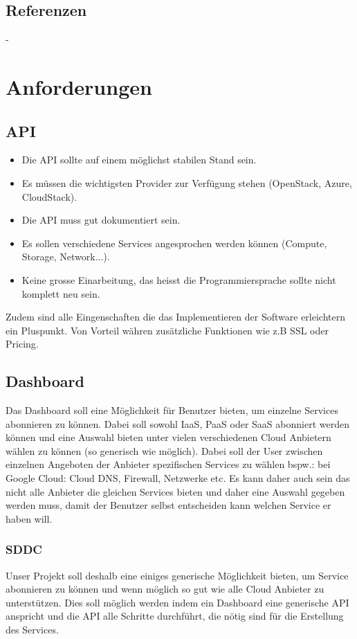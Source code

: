 \documentclass[11pt]{scrartcl}
\begin{document}
\subsection{Referenzen}
-

\section{Anforderungen}
\subsection{API}
\begin{itemize}
\item Die API sollte auf einem möglichst stabilen Stand sein.
\item Es müssen die wichtigsten Provider zur Verfügung stehen (OpenStack, Azure, CloudStack).
\item Die API muss gut dokumentiert sein.
\item Es sollen verschiedene Services angesprochen werden können (Compute, Storage, Network...).
\item Keine grosse Einarbeitung, das heisst die Programmiersprache sollte nicht komplett neu sein.
\end{itemize}

Zudem sind alle Eingenschaften die das Implementieren der Software erleichtern ein Pluspunkt. Von Vorteil währen zusätzliche Funktionen wie z.B SSL oder Pricing. 

\subsection{Dashboard}
Das Dashboard soll eine Möglichkeit für Benutzer bieten, um einzelne Services 
abonnieren zu können.
Dabei soll sowohl IaaS, PaaS oder SaaS abonniert werden können und eine Auswahl 
bieten unter vielen verschiedenen Cloud Anbietern wählen zu können (so generisch wie 
möglich).
Dabei soll der User zwischen einzelnen Angeboten der Anbieter spezifischen 
Services zu wählen bspw.: bei Google Cloud: Cloud DNS, Firewall, Netzwerke etc.
Es kann daher auch sein das nicht alle Anbieter die gleichen Services bieten und 
daher eine Auswahl gegeben werden muss, damit der Benutzer selbst entscheiden 
kann welchen Service er haben will.

\subsubsection{SDDC}
Unser Projekt soll deshalb eine einiges generische Möglichkeit bieten, um 
Service abonnieren zu können und wenn möglich so gut wie alle Cloud Anbieter zu 
unterstützen.
Dies soll möglich werden indem ein Dashboard eine generische API anspricht und 
die API alle Schritte durchführt, die nötig sind für die Erstellung des 
Services.
\end{document}
